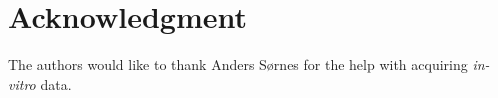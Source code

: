 \documentclass[journal]{IEEEtran}
\begin{document}






%





\section*{Acknowledgment}


The authors would like to thank Anders S\o{}rnes for the help with acquiring \textit{in-vitro} data. 
\end{document}
